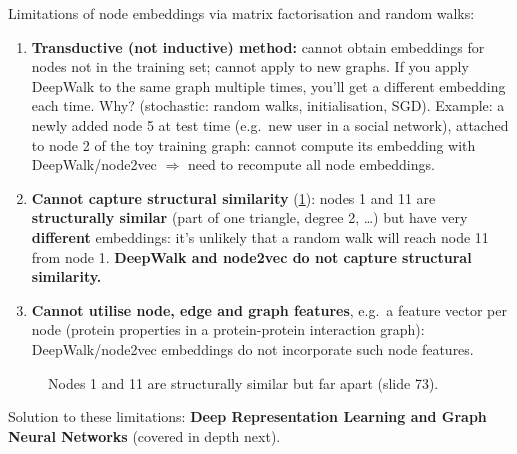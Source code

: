 Limitations of node embeddings via matrix factorisation and random walks:
\begin{enumerate}
  \item \textbf{Transductive (not inductive) method:} cannot obtain embeddings for
    nodes not in the training set; cannot apply to new graphs. If you apply
    DeepWalk to the same graph multiple times, you'll get a different embedding
    each time. Why? (stochastic: random walks, initialisation, SGD).
    Example: a newly added node 5 at test time (e.g.\ new user in a social
    network), attached to node 2 of the toy training graph: cannot compute its
    embedding with DeepWalk/node2vec $\Rightarrow$ need to recompute all node
    embeddings.
  \item \textbf{Cannot capture structural similarity} (\cref{fig:lec02-struct}):
    nodes 1 and 11 are \textbf{structurally similar} (part of one triangle,
    degree 2, \ldots) but have very \textbf{different} embeddings: it's unlikely
    that a random walk will reach node 11 from node 1. \textbf{DeepWalk and
    node2vec do not capture structural similarity.}
  \item \textbf{Cannot utilise node, edge and graph features}, e.g.\ a feature
    vector per node (protein properties in a protein-protein interaction graph):
    DeepWalk/node2vec embeddings do not incorporate such node features.
\end{enumerate}

\begin{figure}[htbp]
  \centering
  \caption{Nodes 1 and 11 are structurally similar but far apart (slide 73).}
  \label{fig:lec02-struct}
\end{figure}

\begin{keyidea}
  Solution to these limitations: \textbf{Deep Representation Learning and Graph
  Neural Networks} (covered in depth next).
\end{keyidea}

